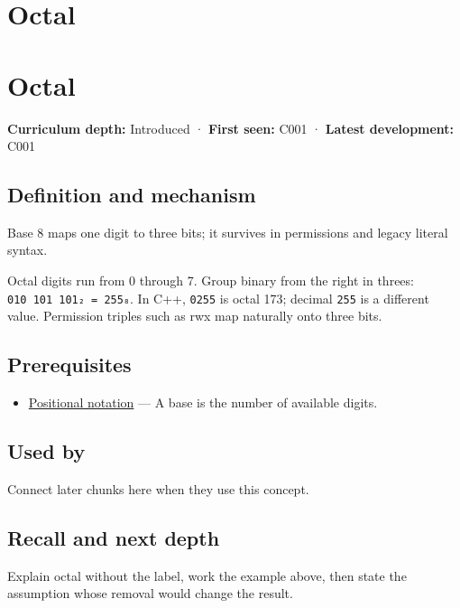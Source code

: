 \hypertarget{appendix-17fc1bc8b305}{}
\section*{Octal}
\section{Octal}\label{octal}

\textbf{Curriculum depth:} Introduced · \textbf{First seen:} C001 · \textbf{Latest development:} C001

\subsection{Definition and mechanism}\label{definition-and-mechanism}

Base 8 maps one digit to three bits; it survives in permissions and legacy literal syntax.

Octal digits run from 0 through 7. Group binary from the right in threes: \texttt{010\ 101\ 101₂\ =\ 255₈}. In C++, \texttt{0255} is octal 173; decimal \texttt{255} is a different value. Permission triples such as rwx map naturally onto three bits.

\subsection{Prerequisites}\label{prerequisites}

\begin{itemize}
\tightlist
\item
  \hyperref[appendix-83c3f28f7bda]{Positional notation} --- A base is the number of available digits.
\end{itemize}

\subsection{Used by}\label{used-by}

Connect later chunks here when they use this concept.

\subsection{Recall and next depth}\label{recall-and-next-depth}

Explain octal without the label, work the example above, then state the assumption whose removal would change the result.

